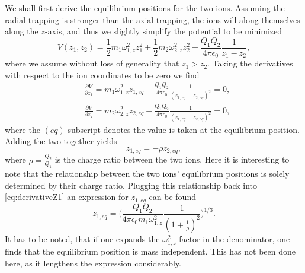 We shall first derive the equilibrium positions for the two ions. Assuming the radial trapping is stronger than the axial trapping, the ions will along themselves along the $z$-axis, and thus we slightly simplify the potential to be minimized
\begin{equation}
    V(z_1,z_2) = \frac{1}{2}m_1\omega_{1,z}^2z_1^2 + \frac{1}{2}m_2\omega_{2,z}^2z_2^2 + \frac{Q_1Q_2}{4\pi\epsilon_0}\frac{1}{z_1-z_2},
\end{equation}
where we assume without loss of generality that $z_1>z_2$. Taking the derivatives with respect to the ion coordinates to be zero we find
\begin{align}
    &\frac{\partial V}{\partial z_{1}} = m_1\omega_{1,z}^2z_{1,eq} - \frac{Q_1Q_2}{4\pi\epsilon_0}\frac{1}{(z_{1,eq}-z_{2,eq})^2}  = 0\label{eq:derivativeZ1},\\
    &\frac{\partial V}{\partial z_{2}} = m_2\omega_{2,z}^2z_{2,eq} + \frac{Q_1Q_2}{4\pi\epsilon_0}\frac{1}{(z_{1,eq}-z_{2,eq})^2} = 0,
\end{align}
where the $(eq)$ subscript denotes the value is taken at the equilibrium position. Adding the two together yields
\begin{equation}
    z_{1,eq} = -\rho z_{2,eq},
\end{equation}
where $\rho = \frac{Q_2}{Q_1}$ is the charge ratio between the two ions. Here it is interesting to note that the relationship between the two ions' equilibrium positions is solely determined by their charge ratio.
Plugging this relationship back into \cref{eq:derivativeZ1} an expression for $z_{1,eq}$ can be found
\begin{equation}
    z_{1,eq} =\bigg(\frac{Q_1Q_2}{4\pi\epsilon_0m_1\omega_{1,z}^2}\frac{1}{(1+\frac{1}{\rho})^2}\bigg)^{1/3}.
\end{equation}
It has to be noted, that if one expands the $\omega_{1,z}^2$ factor in the denominator, one finds that the equilibrium position is mass independent. This has not been done here, as it lengthens the expression considerably.

